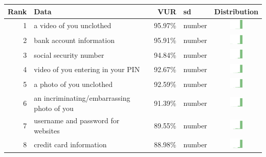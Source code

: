 \begin{table}[t]
\begin{center}
\small
\begin{tabular}{| r | l | r | l |c |}
\hline
Rank & Data & VUR & sd & Distribution \\
\hline
1 & a video of you unclothed & 95.97\% & number & \includegraphics[width = 2cm, height = 0.5cm]{tex-inputs/data10/tookavideoofyouunclothedcombined} \\
2 & bank account information & 95.91\% & number & \includegraphics[width = 2cm, height = 0.5cm]{tex-inputs/data10/learnedyourbankaccountinformationcombined}  \\
3 & social security number & 94.84\% & number & \includegraphics[width = 2cm, height = 0.5cm]{tex-inputs/data10/learnedyoursocialsecuritynumbercombined}\\
4 & video of you entering in your PIN & 92.67\% & number & \includegraphics[width = 2cm, height = 0.5cm]{tex-inputs/data10/tookavideoofyouenteringinyourPINatanATMcombined}\\
5 & a photo of you unclothed & 92.59\% & number & \includegraphics[width = 2cm, height = 0.5cm]{tex-inputs/data10/tookaphotoofyouunclothedcombined}\\
6 & an incriminating/embarrassing photo of you & 91.39\% & number & \includegraphics[width = 2cm, height = 0.5cm]{tex-inputs/data10/tookanincriminatingphotoofyoudoingsomethingembarrassingcombined}\\
7 & username and password for websites & 89.55\% & number & \includegraphics[width = 2cm, height = 0.5cm]{tex-inputs/data10/learnedyourusernameandpasswordforwebsitescombined}\\
8 & credit card information & 88.98\% & number & \includegraphics[width = 2cm, height = 0.5cm]{tex-inputs/data10/learnedyourcreditcardinformationcombined}\\

\end{tabular}
\end{center}
\end{table}
